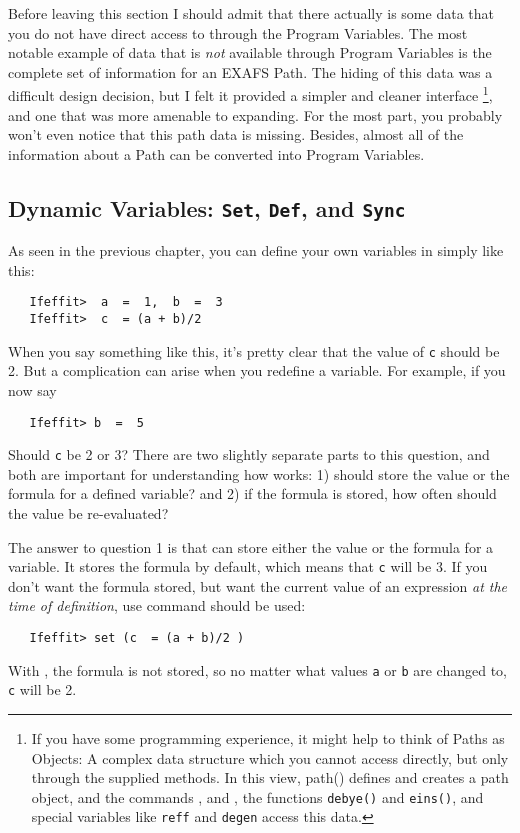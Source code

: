 Before leaving this section I should admit that there actually is some data
that you do not have direct access to through the Program Variables.  The
most notable example of data that is {\emph{not}} available through Program
Variables is the complete set of information for an EXAFS Path.  The hiding
of this data was a difficult design decision, but I felt it provided a
simpler and cleaner interface {\footnote{If you have some programming
    experience, it might help to think of Paths as Objects: A complex data
    structure which you cannot access directly, but only through the
    supplied methods.  In this view, path() defines and creates a path
    object, and the commands {}, {} and
    {}, the functions {\tt{debye()}} and {\tt{eins()}}, and
    special variables like {\tt{reff}} and {\tt{degen}} access this
    data.}}, and one that was more amenable to expanding.  For the most
part, you probably won't even notice that this path data is missing.
Besides, almost all of the information about a Path can be converted into
Program Variables.

\subsection{Dynamic Variables: {\texttt{Set}}, {\texttt{Def}}, and 
{\texttt{Sync}}} \label{Ch:Structure-SetDef}

As seen in the previous chapter, you can define your own variables in
{\ifeffit} simply like this:
\begin{verbatim}
   Ifeffit>  a  =  1,  b  =  3
   Ifeffit>  c  = (a + b)/2
\end{verbatim}
\noindent
When you say something like this, it's pretty clear that the value of
{\tt{c}} should be 2.  But a complication can arise when you redefine a
variable.  For example, if you now say
\begin{verbatim}
   Ifeffit> b  =  5
\end{verbatim}
\noindent
Should {\tt{c}} be 2 or 3?  There are two slightly separate parts to this
question, and both are important for understanding how {\ifeffit} works: 1)
should {\ifeffit} store the value or the formula for a defined variable?
and 2) if the formula is stored, how often should the value be
re-evaluated?

The answer to question 1 is that {\ifeffit} can store either the value or
the formula for a variable.  It stores the formula by default, which means
that {\tt{c}} will be 3.  If you don't want the formula stored, but want
the current value of an expression {\emph{at the time of definition}}, use
{} command should be used:
\begin{verbatim}
   Ifeffit> set (c  = (a + b)/2 )
\end{verbatim}
\noindent
With {}, the formula is not stored, so no matter what values
{\tt{a}} or {\tt{b}} are changed to, {\tt{c}} will be 2.

